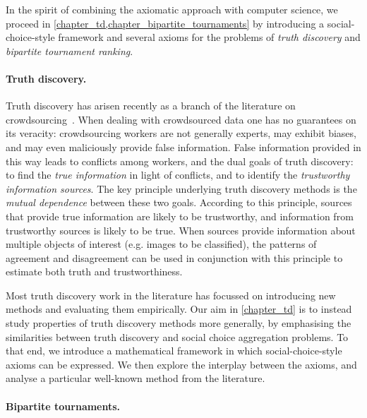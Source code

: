 In the spirit of combining the axiomatic approach with computer science, we
proceed in \cref{chapter_td,chapter_bipartite_tournaments} by introducing a
social-choice-style framework and several axioms for the problems of
\emph{truth discovery} and \emph{bipartite tournament ranking}.

\paragraph{Truth discovery.}

Truth discovery has arisen recently as a branch of the literature on
crowdsourcing~\cite{li_survey_2016}. When dealing with crowdsourced data one
has no guarantees on its veracity: crowdsourcing workers are not generally
experts, may exhibit biases, and may even maliciously provide false
information. False information provided in this way leads to conflicts among
workers, and the dual goals of truth discovery: to find the \emph{true
information} in light of conflicts, and to identify the \emph{trustworthy
information sources}. The key principle underlying truth discovery methods is
the \emph{mutual dependence} between these two goals. According to this
principle, sources that provide true information are likely to be trustworthy,
and information from trustworthy sources is likely to be true. When sources
provide information about multiple objects of interest (e.g. images to be
classified), the patterns of agreement and disagreement can be used in
conjunction with this principle to estimate both truth and trustworthiness.

Most truth discovery work in the literature has focussed on introducing new
methods and evaluating them empirically.\footnotemark{} Our aim in
\cref{chapter_td} is to instead study properties of truth discovery methods
more generally, by emphasising the similarities between truth discovery and
social choice aggregation problems. To that end, we introduce a mathematical
framework in which social-choice-style axioms can be expressed. We then explore
the interplay between the axioms, and analyse a particular well-known method
from the literature.


\paragraph{Bipartite tournaments.}

